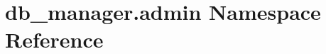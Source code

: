 \hypertarget{namespacedb__manager_1_1admin}{\section{db\-\_\-manager.\-admin Namespace Reference}
\label{namespacedb__manager_1_1admin}
}
